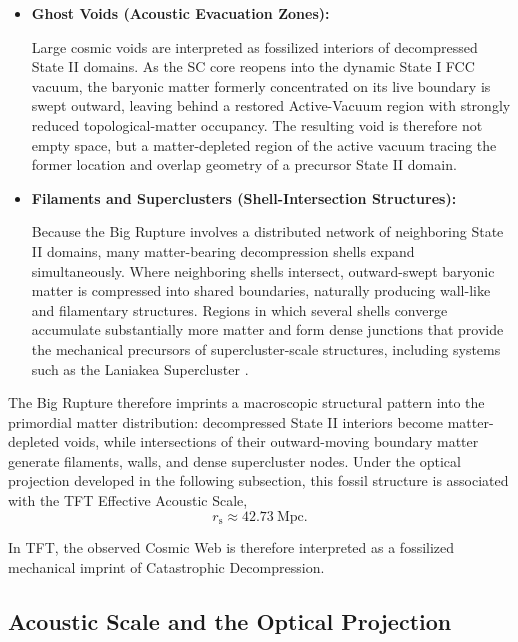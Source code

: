 \begin{itemize}

    \item \textbf{Ghost Voids (Acoustic Evacuation Zones):}
    
    Large cosmic voids are interpreted as fossilized interiors of decompressed State II domains. As the SC core reopens into the dynamic State I FCC vacuum, the baryonic matter formerly concentrated on its live boundary is swept outward, leaving behind a restored Active-Vacuum region with strongly reduced topological-matter occupancy. The resulting void is therefore not empty space, but a matter-depleted region of the active vacuum tracing the former location and overlap geometry of a precursor State II domain.

    \item \textbf{Filaments and Superclusters (Shell-Intersection Structures):}
    
    Because the Big Rupture involves a distributed network of neighboring State II domains, many matter-bearing decompression shells expand simultaneously. Where neighboring shells intersect, outward-swept baryonic matter is compressed into shared boundaries, naturally producing wall-like and filamentary structures. Regions in which several shells converge accumulate substantially more matter and form dense junctions that provide the mechanical precursors of supercluster-scale structures, including systems such as the Laniakea Supercluster \cite{Tully_2014}.

\end{itemize}

The Big Rupture therefore imprints a macroscopic structural pattern into the primordial matter distribution: decompressed State II interiors become matter-depleted voids, while intersections of their outward-moving boundary matter generate filaments, walls, and dense supercluster nodes. Under the optical projection developed in the following subsection, this fossil structure is associated with the TFT Effective Acoustic Scale,
\begin{equation}
    r_{\mathrm{s}}
    \approx
    42.73\ \mathrm{Mpc}.
\end{equation}

In TFT, the observed Cosmic Web is therefore interpreted as a fossilized mechanical imprint of Catastrophic Decompression.

\subsection{Acoustic Scale and the Optical Projection}
\label{sec:acoustic_variance}

